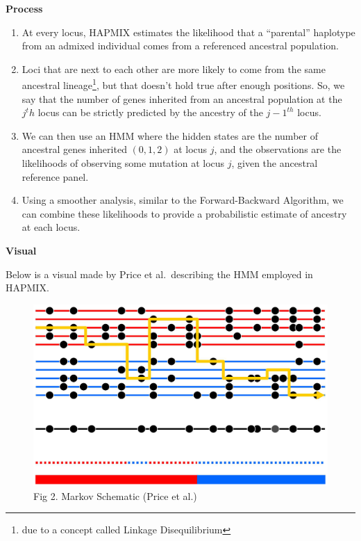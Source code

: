 \documentclass[
]{book}
\begin{document}
\textbf{Process}

\begin{enumerate}
\def\labelenumi{\arabic{enumi})}
\item
  At every locus, HAPMIX estimates the likelihood that a ``parental'' haplotype from an admixed individual comes from a referenced ancestral population.
\item
  Loci that are next to each other are more likely to come from the same ancestral lineage\footnote{due to a concept called Linkage Disequilibrium}, but that doesn't hold true after enough positions. So, we say that the number of genes inherited from an ancestral population at the \(j^th\) locus can be strictly predicted by the ancestry of the \({j-1}^{th}\) locus.
\item
  We can then use an HMM where the hidden states are the number of ancestral genes inherited \((0,1,2)\) at locus \(j\), and the observations are the likelihoods of observing some mutation at locus \(j\), given the ancestral reference panel.
\item
  Using a smoother analysis, similar to the Forward-Backward Algorithm, we can combine these likelihoods to provide a probabilistic estimate of ancestry at each locus.
\end{enumerate}

\textbf{Visual}

Below is a visual made by Price et al.~describing the HMM employed in HAPMIX.

\begin{figure}
\centering
\includegraphics{images/hapmix.png}
\caption{Fig 2. Markov Schematic (Price et al.)}
\end{figure}
\end{document}
